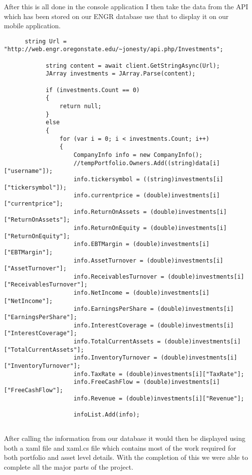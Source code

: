 \documentclass[letterpaper,10pt,titlepage,journal,compsoc,draftclsnofoot,onecolumn]{IEEEtran}
\begin{document}
After this is all done in the console application I then take the data from the API which has been stored on our ENGR database use that to display it on our mobile application.

     \begin{lstlisting} 
      string Url = "http://web.engr.oregonstate.edu/~jonesty/api.php/Investments";

            string content = await client.GetStringAsync(Url);
            JArray investments = JArray.Parse(content);

            if (investments.Count == 0)
            {
                return null;
            }
            else
            {
                for (var i = 0; i < investments.Count; i++)
                {
                    CompanyInfo info = new CompanyInfo();
                    //tempPortfolio.Owners.Add((string)data[i]["username"]);
                    info.tickersymbol = ((string)investments[i]["tickersymbol"]);
                    info.currentprice = (double)investments[i]["currentprice"];
                    info.ReturnOnAssets = (double)investments[i]["ReturnOnAssets"];
                    info.ReturnOnEquity = (double)investments[i]["ReturnOnEquity"];
                    info.EBTMargin = (double)investments[i]["EBTMargin"];
                    info.AssetTurnover = (double)investments[i]["AssetTurnover"];
                    info.ReceivablesTurnover = (double)investments[i]["ReceivablesTurnover"];
                    info.NetIncome = (double)investments[i]["NetIncome"];
                    info.EarningsPerShare = (double)investments[i]["EarningsPerShare"];
                    info.InterestCoverage = (double)investments[i]["InterestCoverage"];
                    info.TotalCurrentAssets = (double)investments[i]["TotalCurrentAssets"];
                    info.InventoryTurnover = (double)investments[i]["InventoryTurnover"];
                    info.TaxRate = (double)investments[i]["TaxRate"];
                    info.FreeCashFlow = (double)investments[i]["FreeCashFlow"];
                    info.Revenue = (double)investments[i]["Revenue"];

                    infoList.Add(info);
     
     \end{lstlisting} 
     
     After calling the information from our database it would then be displayed using both a xaml file and xaml.cs file which contains most of the work required for both portfolio and asset level details. With the completion of this we were able to complete all the major parts of the project. 
     
\end{document}

